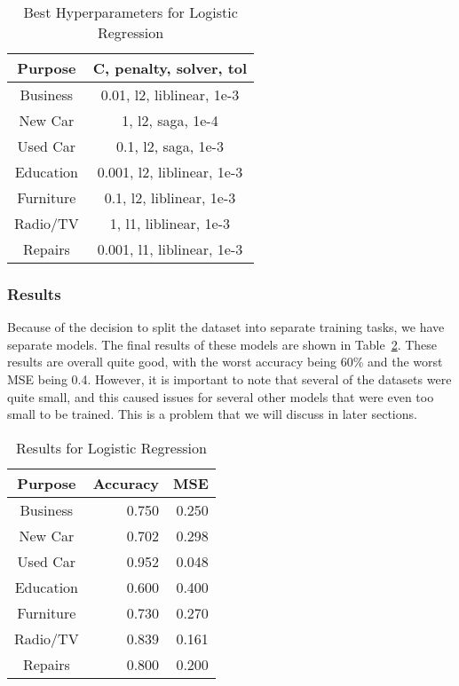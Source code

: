 \documentclass[12pt,twocolumn]{article}
\begin{document}
\begin{table}
    \centering
    \begin{tabular}{|c|c|}
        \hline
        Purpose & C, penalty, solver, tol \\
        \hline
        \hline
        Business & 0.01, l2, liblinear, 1e-3 \\
        \hline
        New Car & 1, l2, saga, 1e-4 \\
        \hline
        Used Car & 0.1, l2, saga, 1e-3 \\
        \hline
        Education & 0.001, l2, liblinear, 1e-3 \\
        \hline
        Furniture & 0.1, l2, liblinear, 1e-3 \\
        \hline
        Radio/TV & 1, l1, liblinear, 1e-3 \\
        \hline
        Repairs & 0.001, l1, liblinear, 1e-3 \\
        \hline
    \end{tabular}
    \caption{Best Hyperparameters for Logistic Regression}\label{tab:logistic_regression_best_hyperparameters}
\end{table}


\subsubsection{Results}
Because of the decision to split the dataset into  separate training tasks, we have separate models. The final results of these models are shown in Table~\ref{tab:logistic_regression_results}. These results are overall quite good, with the worst accuracy being 60\% and the worst MSE being 0.4. However, it is important to note that several of the datasets were quite small, and this caused issues for several other models that were even too small to be trained. This is a problem that we will discuss in later sections.

\begin{table}
    \centering
    \begin{tabular}{|c|r|r|}
        \hline
        Purpose & Accuracy & MSE \\
        \hline
        \hline
        Business & 0.750 & 0.250 \\
        \hline
        New Car & 0.702 & 0.298 \\
        \hline
        Used Car & 0.952 & 0.048 \\
        \hline
        Education & 0.600 & 0.400 \\
        \hline
        Furniture & 0.730 & 0.270 \\
        \hline
        Radio/TV & 0.839 & 0.161 \\
        \hline
        Repairs & 0.800 & 0.200 \\
        \hline
    \end{tabular}
    \caption{Results for Logistic Regression}\label{tab:logistic_regression_results}
\end{table}
\end{document}
